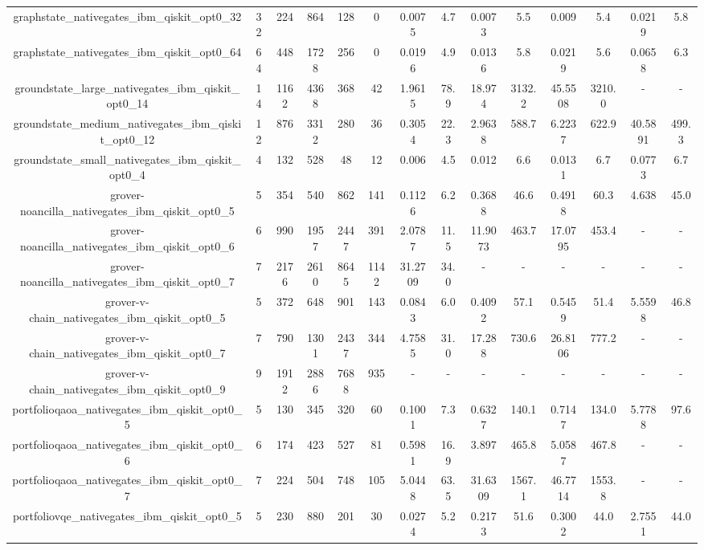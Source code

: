 \begin{table}[htb]
{\begin{tabular}{|c|c|c|c|c|c|c|c|c|c|c|c|c|c|}
graphstate\_nativegates\_ibm\_qiskit\_opt0\_32 & 32 & 224 & 864 & 128 & 0 & 0.0075 & 4.7 & 0.0073 & 5.5 & 0.009 & 5.4 & 0.0219 & 5.8 \\ 
graphstate\_nativegates\_ibm\_qiskit\_opt0\_64 & 64 & 448 & 1728 & 256 & 0 & 0.0196 & 4.9 & 0.0136 & 5.8 & 0.0219 & 5.6 & 0.0658 & 6.3 \\ 
groundstate\_large\_nativegates\_ibm\_qiskit\_opt0\_14 & 14 & 1162 & 4368 & 368 & 42 & 1.9615 & 78.9 & 18.974 & 3132.2 & 45.5508 & 3210.0 & - & - \\ 
groundstate\_medium\_nativegates\_ibm\_qiskit\_opt0\_12 & 12 & 876 & 3312 & 280 & 36 & 0.3054 & 22.3 & 2.9638 & 588.7 & 6.2237 & 622.9 & 40.5891 & 499.3 \\ 
groundstate\_small\_nativegates\_ibm\_qiskit\_opt0\_4 & 4 & 132 & 528 & 48 & 12 & 0.006 & 4.5 & 0.012 & 6.6 & 0.0131 & 6.7 & 0.0773 & 6.7 \\ 
grover-noancilla\_nativegates\_ibm\_qiskit\_opt0\_5 & 5 & 354 & 540 & 862 & 141 & 0.1126 & 6.2 & 0.3688 & 46.6 & 0.4918 & 60.3 & 4.638 & 45.0 \\ 
grover-noancilla\_nativegates\_ibm\_qiskit\_opt0\_6 & 6 & 990 & 1957 & 2447 & 391 & 2.0787 & 11.5 & 11.9073 & 463.7 & 17.0795 & 453.4 & - & - \\ 
grover-noancilla\_nativegates\_ibm\_qiskit\_opt0\_7 & 7 & 2176 & 2610 & 8645 & 1142 & 31.2709 & 34.0 & - & - & - & - & - & - \\ 
grover-v-chain\_nativegates\_ibm\_qiskit\_opt0\_5 & 5 & 372 & 648 & 901 & 143 & 0.0843 & 6.0 & 0.4092 & 57.1 & 0.5459 & 51.4 & 5.5598 & 46.8 \\ 
grover-v-chain\_nativegates\_ibm\_qiskit\_opt0\_7 & 7 & 790 & 1301 & 2437 & 344 & 4.7585 & 31.0 & 17.288 & 730.6 & 26.8106 & 777.2 & - & - \\ 
grover-v-chain\_nativegates\_ibm\_qiskit\_opt0\_9 & 9 & 1912 & 2886 & 7688 & 935 & - & - & - & - & - & - & - & - \\ 
portfolioqaoa\_nativegates\_ibm\_qiskit\_opt0\_5 & 5 & 130 & 345 & 320 & 60 & 0.1001 & 7.3 & 0.6327 & 140.1 & 0.7147 & 134.0 & 5.7788 & 97.6 \\ 
portfolioqaoa\_nativegates\_ibm\_qiskit\_opt0\_6 & 6 & 174 & 423 & 527 & 81 & 0.5981 & 16.9 & 3.897 & 465.8 & 5.0587 & 467.8 & - & - \\ 
portfolioqaoa\_nativegates\_ibm\_qiskit\_opt0\_7 & 7 & 224 & 504 & 748 & 105 & 5.0448 & 63.5 & 31.6309 & 1567.1 & 46.7714 & 1553.8 & - & - \\ 
portfoliovqe\_nativegates\_ibm\_qiskit\_opt0\_5 & 5 & 230 & 880 & 201 & 30 & 0.0274 & 5.2 & 0.2173 & 51.6 & 0.3002 & 44.0 & 2.7551 & 44.0 \\ 

\end{tabular}}
\end{table}
